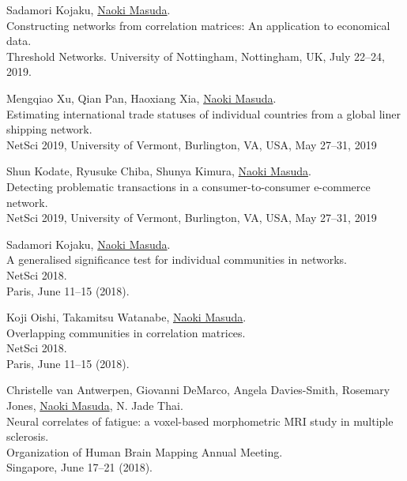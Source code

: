 \documentclass[11pt,letter]{article}
\begin{document}
\begin{etaremune}
\item Sadamori Kojaku, \underline{Naoki Masuda}.\\
Constructing networks from correlation matrices: An application to economical data.\\
Threshold Networks. University of Nottingham, Nottingham, UK, July 22--24, 2019.

\item Mengqiao Xu, Qian Pan, Haoxiang Xia, \underline{Naoki Masuda}.\\
Estimating international trade statuses of individual countries from a global liner shipping network.\\
NetSci 2019, University of Vermont, Burlington, VA, USA, May 27--31, 2019

\item Shun Kodate, Ryusuke Chiba, Shunya Kimura, \underline{Naoki Masuda}.\\
Detecting problematic transactions in a consumer-to-consumer e-commerce network.\\
NetSci 2019, University of Vermont, Burlington, VA, USA, May 27--31, 2019\\

\item Sadamori Kojaku, \underline{Naoki Masuda}.\\
A generalised significance test for individual communities in networks.\\
NetSci 2018.\\
Paris, June 11--15 (2018).

\item Koji Oishi, Takamitsu Watanabe, \underline{Naoki Masuda}.\\
Overlapping communities in correlation matrices.\\
NetSci 2018.\\
Paris, June 11--15 (2018).

\item Christelle van Antwerpen, Giovanni DeMarco, Angela Davies-Smith, Rosemary Jones, \underline{Naoki Masuda}, N. Jade Thai.\\
Neural correlates of fatigue: a voxel-based morphometric MRI study in multiple sclerosis.\\
Organization of Human Brain Mapping Annual Meeting.\\
Singapore, June 17--21 (2018).


\end{etaremune}
\end{document}
